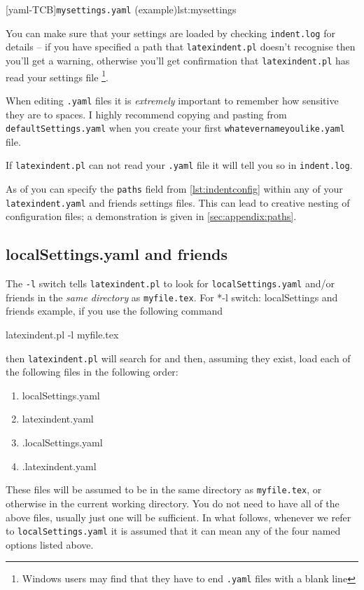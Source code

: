 \documentclass[10pt]{article}
\begin{document}
 [yaml-TCB]{\texttt{mysettings.yaml} (example)}{lst:mysettings}

 You can make sure that your settings are loaded by checking \texttt{indent.log} for
 details -- if you have specified a path that \texttt{latexindent.pl} doesn't recognise
 then you'll get a warning, otherwise you'll get confirmation that
 \texttt{latexindent.pl} has read your settings file \footnote{Windows users may find
 that they have to end \texttt{.yaml} files with a blank line}. 

 \begin{warning}
  When editing \texttt{.yaml} files it is \emph{extremely} important to remember how
  sensitive they are to spaces. I highly recommend copying and pasting from
  \texttt{defaultSettings.yaml} when you create your first
  \texttt{whatevernameyoulike.yaml} file.

  If \texttt{latexindent.pl} can not read your \texttt{.yaml} file it will tell you so in
  \texttt{indent.log}.
 \end{warning}

 As of  you can specify the
 \texttt{paths} field from \cref{lst:indentconfig} within any of your
 \texttt{latexindent.yaml} and friends settings files. This can lead to creative nesting
 of configuration files; a demonstration is given in \vref{sec:appendix:paths}.

\subsection{localSettings.yaml and friends}\label{sec:localsettings}
 The \texttt{-l} switch tells \texttt{latexindent.pl} to look for
 \texttt{localSettings.yaml} and/or friends in the \emph{same directory} as
 \texttt{myfile.tex}. For%
 *{-l
 switch: localSettings and friends} example, if you use the following command

 \begin{commandshell}
latexindent.pl -l myfile.tex
\end{commandshell}

 then \texttt{latexindent.pl} will search for and then, assuming they exist, load each of
 the following files in the following order:
 \begin{enumerate}
  \item localSettings.yaml
  \item latexindent.yaml
  \item .localSettings.yaml
  \item .latexindent.yaml
 \end{enumerate}
 These files will be assumed to be in the same directory as \texttt{myfile.tex}, or
 otherwise in the current working directory. You do not need to have all of the above
 files, usually just one will be sufficient. In what follows, whenever we refer to
 \texttt{localSettings.yaml} it is assumed that it can mean any of the four named options
 listed above.
\end{document}

